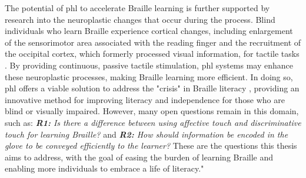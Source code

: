The potential of \gls{phl} to accelerate Braille learning is further supported by research into the neuroplastic changes that occur during the process. Blind individuals who learn Braille experience cortical changes, including enlargement of the sensorimotor area associated with the reading finger and the recruitment of the occipital cortex, which formerly processed visual information, for tactile tasks \cite{Hamilton1998a}. By providing continuous, passive tactile stimulation, \gls{phl} systems may enhance these neuroplastic processes, making Braille learning more efficient. In doing so, \gls{phl} offers a viable solution to address the "crisis" in Braille literacy \cite{Seim2014a}, providing an innovative method for improving literacy and independence for those who are blind or visually impaired.
However, many open questions remain in this domain, such as: \textit{\textbf{R1:} Is there a difference between using affective touch and discriminative touch for learning Braille?} and \textit{\textbf{R2:} How should information be encoded in the glove to be conveyed efficiently to the learner?} These are the questions this thesis aims to address, with the goal of easing the burden of learning Braille and enabling more individuals to embrace a life of literacy."
  





